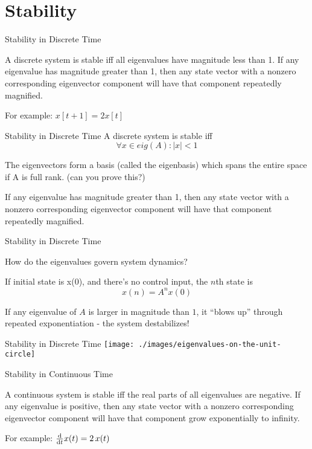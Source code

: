 \section{Stability}

\begin{frame}{Stability in Discrete Time}

A discrete system is stable iff all eigenvalues have magnitude less than 1. If any eigenvalue has magnitude greater than 1, then any state vector with a nonzero corresponding eigenvector component will have that component repeatedly magnified.

    For example: \(x[t+1] = 2 x[t]\)

\end{frame}

\begin{frame}{Stability in Discrete Time}
A discrete system is stable iff
    \[
        \forall x \in eig(A) : |x| < 1
    \]

The eigenvectors form a basis (called the eigenbasis) which spans the entire space if A is full rank. (can you prove this?)

If any eigenvalue has magnitude greater than 1, then any state vector with a nonzero corresponding eigenvector component will have that component repeatedly magnified.
\end{frame}

\begin{frame}{Stability in Discrete Time}

How do the eigenvalues govern system dynamics?

    If initial state is x(0), and there's no control input, the \(n\)th state is
    \[
        x(n) = A^n x(0)
    \]

    If any eigenvalue of \(A\) is larger in magnitude than \(1\), it ``blows up'' through repeated exponentiation - the system destabilizes!
\end{frame}

\begin{frame}{Stability in Discrete Time}
    \texttt{[image: ./images/eigenvalues-on-the-unit-circle]}
\end{frame}

\begin{frame}{Stability in Continuous Time}

A continuous system is stable iff the real parts of all eigenvalues are negative. If any eigenvalue is positive, then any state vector with a nonzero corresponding eigenvector component will have that component grow exponentially to infinity.

    For example: \(\ddt{}x(t) = 2\,x(t)\)

\end{frame}

